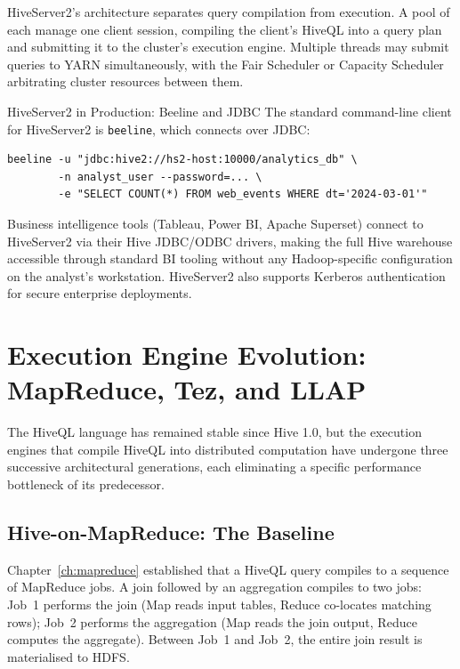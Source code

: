 HiveServer2's architecture separates query compilation from execution.
A pool of  each manage one client session,
compiling the client's HiveQL into a query plan and submitting it to the
cluster's execution engine. Multiple threads may submit queries to YARN
simultaneously, with the Fair Scheduler or Capacity Scheduler arbitrating
cluster resources between them.

\begin{systemdesign}{HiveServer2 in Production: Beeline and JDBC}
The standard command-line client for HiveServer2 is \texttt{beeline},
which connects over JDBC:
\begin{lstlisting}[style=shell]
beeline -u "jdbc:hive2://hs2-host:10000/analytics_db" \
        -n analyst_user --password=... \
        -e "SELECT COUNT(*) FROM web_events WHERE dt='2024-03-01'"
\end{lstlisting}
Business intelligence tools (Tableau, Power BI, Apache Superset) connect
to HiveServer2 via their Hive JDBC/ODBC drivers, making the full Hive
warehouse accessible through standard BI tooling without any
Hadoop-specific configuration on the analyst's workstation. HiveServer2
also supports Kerberos authentication for secure enterprise deployments.
\end{systemdesign}

\section{Execution Engine Evolution: MapReduce, Tez, and LLAP}
\label{sec:execution-engines}

The HiveQL language has remained stable since Hive 1.0, but the execution
engines that compile HiveQL into distributed computation have undergone
three successive architectural generations, each eliminating a specific
performance bottleneck of its predecessor.

\subsection{Hive-on-MapReduce: The Baseline}
\label{subsec:hive-mr}

Chapter~\ref{ch:mapreduce} established that a HiveQL query compiles to
a sequence of MapReduce jobs. A join followed by an aggregation compiles
to two jobs: Job~1 performs the join (Map reads input tables, Reduce
co-locates matching rows); Job~2 performs the aggregation (Map reads the
join output, Reduce computes the aggregate). Between Job~1 and Job~2,
the entire join result is materialised to HDFS.

